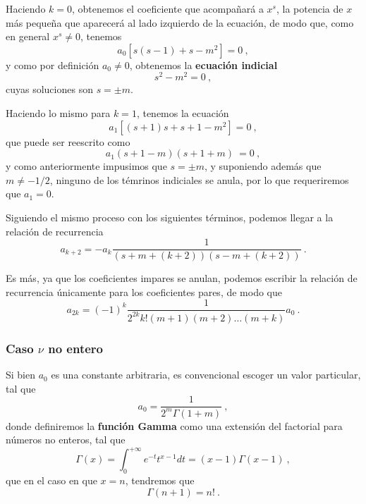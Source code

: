 Haciendo $k = 0$, obtenemos el coeficiente que acompañará a $x^s$, la potencia de $x$ más pequeña que aparecerá al lado izquierdo de la ecuación, de modo que, como en general $x^s \neq 0$, tenemos
\begin{equation}
    a_0 \left[ s(s-1) + s - m^2 \right] = 0 \ ,
\end{equation}
y como por definición $a_0 \neq 0$, obtenemos la \textbf{ecuación indicial}
\begin{equation}
    s^2 - m^2 = 0 \ ,
\end{equation}
cuyas soluciones son $s = \pm m$.

Haciendo lo mismo para $k = 1$, tenemos la ecuación
\begin{equation}
    a_1\left[ (s+1)s + s + 1 - m^2 \right] = 0 \ ,
\end{equation}
que puede ser reescrito como
\begin{equation}
    a_1(s+1-m)(s+1+m) \ = 0 \ ,
\end{equation}
y como anteriormente impusimos que $s=\pm m$, y suponiendo además que $m \neq -1/2$, ninguno de los témrinos indiciales se anula, por lo que requeriremos que $a_1 = 0$.

Siguiendo el mismo proceso con los siguientes términos, podemos llegar a la relación de recurrencia
\begin{equation}
    a_{k + 2} = -a_k \frac{1}{(s+m+(k+2))(s-m+(k+2))} \ .
\end{equation} 

Es más, ya que los coeficientes impares se anulan, podemos escribir la relación de recurrencia únicamente para los coeficientes pares, de modo que
\begin{equation}
    a_{2k} = (-1)^k \frac{1}{2^{2k} k! (m + 1) (m + 2) \dots (m + k)}a_0 \ .
\end{equation}

\subsubsection{Caso $\nu$ no entero}

Si bien $a_0$ es una constante arbitraria, es convencional escoger un valor particular, tal que
\begin{equation} \label{eq:a0_convencional}
    a_0 = \frac{1}{2^m \Gamma(1+m)} \ ,
\end{equation}
donde definiremos la \textbf{función Gamma} como una extensión del factorial para números no enteros, tal que
\begin{equation}
    \Gamma(x) = \int_0^{+\infty} e^{-t} t^{x-1} dt = (x-1) \Gamma(x-1)\ ,
\end{equation}
que en el caso en que $x=n$, tendremos que
\begin{equation}
    \Gamma(n+1) = n! \ .
\end{equation}

